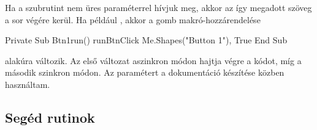 \begin{description}
  Ha a  szubrutint nem üres 
  paraméterrel hívjuk meg,
  akkor az így megadott szöveg a
   sor végére kerül. Ha például
  , akkor a gomb makró-hozzárendelése 
\begin{VBAframe}
Private Sub Btn1run() 
  runBtnClick Me.Shapes("Button 1"), True 
End Sub
\end{VBAframe}
alakúra változik. Az első változat aszinkron módon hajtja végre a kódot, míg
a második szinkron módon.  Az  paramétert a dokumentáció
készítése közben használtam.
\end{description}

\subsection{Segéd rutinok}
